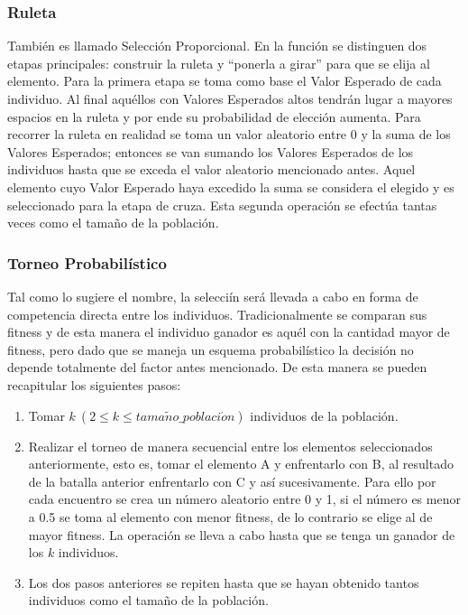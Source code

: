 \documentclass[class=report, crop=false]{standalone}
\begin{document}
\subsubsection{Ruleta}
También es llamado Selección Proporcional.\break
En la función se distinguen dos etapas principales: construir 
la ruleta y ``ponerla a girar'' para que se elija al elemento.\break
Para la primera etapa se toma como base el Valor Esperado de 
cada individuo.\break
Al final aquéllos con Valores Esperados altos tendrán lugar 
a mayores espacios en la ruleta y por ende su probabilidad de 
elección aumenta.\medskip\break
Para recorrer la ruleta en realidad se toma un valor aleatorio 
entre 0 y la suma de los Valores Esperados; entonces se van 
sumando los Valores Esperados de los individuos hasta que se 
exceda el valor aleatorio mencionado antes.\break
Aquel elemento cuyo Valor Esperado haya excedido la suma se 
considera el elegido y es seleccionado para la etapa de cruza.\break
Esta segunda operación se efectúa tantas veces como el tamaño 
de la población.

\subsubsection{Torneo Probabilístico}
Tal como lo sugiere el nombre, la selecciín será llevada a 
cabo en forma de competencia directa entre los individuos.\break
Tradicionalmente se comparan sus fitness y de esta manera 
el individuo ganador es aquél con la cantidad mayor de fitness, 
pero dado que se maneja un esquema probabilístico la 
decisión no depende totalmente del factor antes mencionado.\medskip\break
De esta manera se pueden recapitular los siguientes pasos:

\begin{enumerate}
\item Tomar $k\ (2 \leqslant k \leqslant tama\tilde{n}o\_poblaci\acute{o}n)$ individuos 
de la población.
\item Realizar el torneo de manera secuencial entre los 
elementos seleccionados anteriormente, esto es, tomar el 
elemento A y enfrentarlo con B, al resultado de la batalla 
anterior enfrentarlo con C y así sucesivamente.\break
Para ello por cada encuentro se crea un número aleatorio 
entre 0 y 1, si el número es menor a 0.5 se toma al elemento 
con menor fitness, de lo contrario se elige al de mayor fitness.\break
La operación se lleva a cabo hasta que se tenga un ganador 
de los $k$ individuos.
\item Los dos pasos anteriores se repiten hasta que se hayan 
obtenido tantos individuos como el tamaño de la población.
\end{enumerate}
\end{document}
